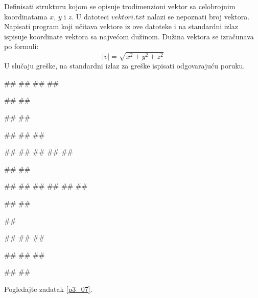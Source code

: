 \begin{Exercise}[label=p3_x5]         
Definisati strukturu kojom se opisuje trodimenzioni vektor sa celobrojnim koordinatama $x$, $y$ i $z$.
U datoteci $vektori.txt$ nalazi se nepoznati broj vektora. 
Napisati program koji učitava vektore iz ove datoteke i na standardni izlaz ispisuje 
koordinate vektora sa najvećom dužinom. 
Dužina vektora se izračunava po formuli:
$$|v|= \sqrt{x^2+y^2+z^2}$$
U slučaju greške, na standardni izlaz za greške ispisati odgovarajuću poruku.

\begin{minitest}
\begin{upotreba}{1}
##
##
##
##

#\naslovIzlaz#
##
\end{upotreba}
\end{minitest}
\begin{minitest}
\begin{upotreba}{2}
##
##

#\naslovIzlazZaGresku#
##
##
\end{upotreba}
\end{minitest}
\begin{minitest}
\begin{upotreba}{3}
##
##
##
##
##

#\naslovIzlaz#
##
\end{upotreba}
\end{minitest}

\begin{minitest}
\begin{upotreba}{4}
##
##
##
##
##
##

#\naslovIzlaz#
##
\end{upotreba}
\end{minitest}
\begin{minitest}
\begin{upotreba}{5}
##

#\naslovIzlazZaGresku#
##
##
\end{upotreba}
\end{minitest}
\begin{minitest}
\begin{upotreba}{6}
##
##
##

#\naslovIzlaz#
##
\end{upotreba}
\end{minitest}
\end{Exercise}
\begin{Answer}[ref=p3_x5]
Pogledajte zadatak \ref{p3_07}.
\end{Answer}


